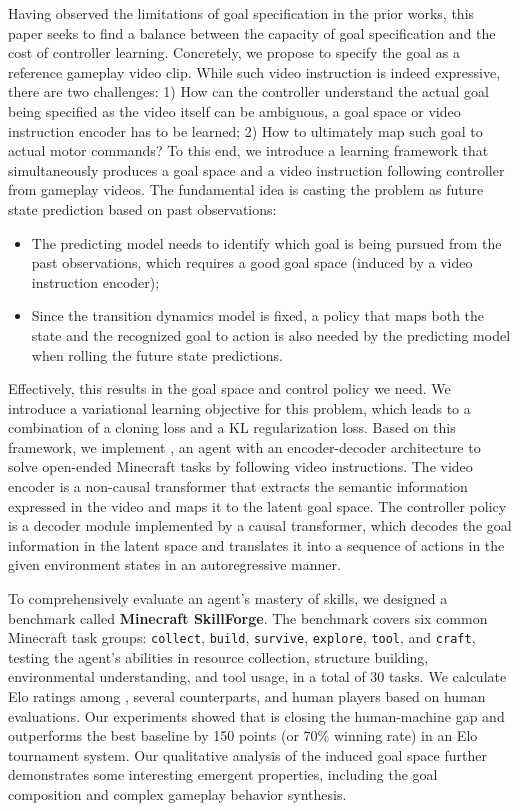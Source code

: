 \documentclass[11pt, a4paper, logo, one column]{craftjarvis}
\begin{document}
Having observed the limitations of goal specification in the prior works, this paper seeks to find a balance between the capacity of goal specification and the cost of controller learning. Concretely, we propose to specify the goal as a reference gameplay video clip. While such video instruction is indeed expressive, there are two challenges: 1) How can the controller understand the actual goal being specified as the video itself can be ambiguous, \ie a goal space or video instruction encoder has to be learned; 2) How to ultimately map such goal to actual motor commands? To this end, we introduce a learning framework that simultaneously produces a goal space and a video instruction following controller from gameplay videos. The fundamental idea is casting the problem as future state prediction based on past observations:
\begin{itemize}[leftmargin=*,noitemsep,topsep=0pt]
    \item The predicting model needs to identify which goal is being pursued from the past observations, which requires a good goal space (induced by a video instruction encoder);
    \item Since the transition dynamics model is fixed, a policy that maps both the state and the recognized goal to action is also needed by the predicting model when rolling the future state predictions. 
\end{itemize}
Effectively, this results in the goal space and control policy we need. We introduce a variational learning objective for this problem, which leads to a combination of a cloning loss and a KL regularization loss. Based on this framework, we implement \agent, an agent with an encoder-decoder architecture to solve open-ended Minecraft tasks by following video instructions. The video encoder is a non-causal transformer that extracts the semantic information expressed in the video and maps it to the latent goal space. The controller policy is a decoder module implemented by a causal transformer, which decodes the goal information in the latent space and translates it into a sequence of actions in the given environment states in an autoregressive manner. 

To comprehensively evaluate an agent's mastery of skills, we designed a benchmark called \textbf{Minecraft SkillForge}. The benchmark covers six common Minecraft task groups: \texttt{collect}, \texttt{build}, \texttt{survive}, \texttt{explore}, \texttt{tool}, and \texttt{craft}, testing the agent's abilities in resource collection, structure building, environmental understanding, and tool usage, in a total of 30 tasks. We calculate Elo ratings among \agent, several counterparts, and human players based on human evaluations. Our experiments showed that \agent is closing the human-machine gap and outperforms the best baseline by 150 points (or 70\% winning rate) in an Elo tournament system. Our qualitative analysis of the induced goal space further demonstrates some interesting emergent properties, including the goal composition and complex gameplay behavior synthesis. 
\end{document}
